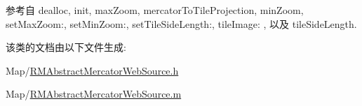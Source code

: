参考自 dealloc, init, max\-Zoom, mercator\-To\-Tile\-Projection, min\-Zoom, set\-Max\-Zoom\-:, set\-Min\-Zoom\-:, set\-Tile\-Side\-Length\-:, tile\-Image\-: , 以及 tile\-Side\-Length.



该类的文档由以下文件生成\-:\begin{DoxyCompactItemize}
\item 
Map/\hyperlink{_r_m_abstract_mercator_web_source_8h}{R\-M\-Abstract\-Mercator\-Web\-Source.\-h}\item 
Map/\hyperlink{_r_m_abstract_mercator_web_source_8m}{R\-M\-Abstract\-Mercator\-Web\-Source.\-m}\end{DoxyCompactItemize}
